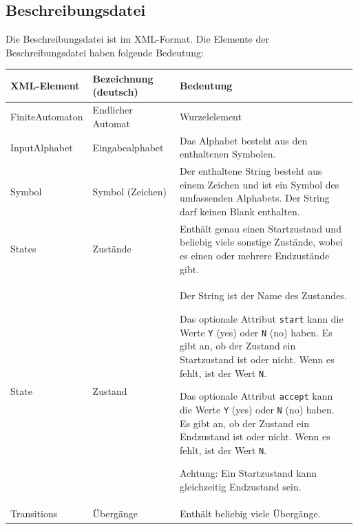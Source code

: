 \subsection{Beschreibungsdatei\label{sec:2:3}}
Die Beschreibungsdatei ist im XML-Format. Die Elemente der Beschreibungsdatei
haben folgende Bedeutung:

{\footnotesize
\begin{table}[H]\centering
\begin{tabular}{|l|l|l|}\hline
XML-Element     & Bezeichnung (deutsch) & Bedeutung      \\ \hline \hline
FiniteAutomaton & Endlicher Automat     & Wurzelelement  \\ \hline
InputAlphabet   & Eingabealphabet       & 
	\begin{minipage}{0.5\textwidth}
		Das Alphabet besteht aus den enthaltenen Symbolen.\vspace{0.5ex}
	\end{minipage}\\ \hline
Symbol         & Symbol (Zeichen)      &
	\begin{minipage}{0.5\textwidth}
		Der enthaltene String besteht aus einem Zeichen und ist ein Symbol des
		umfassenden Alphabets. Der String darf keinen Blank enthalten.
		\vspace{0.5ex}
	\end{minipage}\\ \hline
States         & Zustände              &
	\begin{minipage}{0.5\textwidth}
		Enthält genau einen Startzustand und beliebig viele sonstige Zustände,
		wobei es einen oder mehrere Endzustände gibt.
		\vspace{0.5ex}
	\end{minipage}\\ \hline
State          & Zustand               &
	\begin{minipage}{0.5\textwidth}
		Der String ist der Name des Zustandes.

		Das optionale Attribut \texttt{start} kann die Werte \texttt{Y} (yes) oder 
		\texttt{N} (no)
		haben. Es gibt an, ob der Zustand ein Startzustand ist oder nicht. Wenn
		es fehlt, ist der Wert \texttt{N}.

		Das optionale Attribut \texttt{accept} kann die Werte \texttt{Y} (yes) 
		oder \texttt{N} (no)
		haben. Es gibt an, ob der Zustand ein Endzustand ist oder nicht. Wenn
		es fehlt, ist der Wert \texttt{N}.

		Achtung: Ein Startzustand kann gleichzeitig Endzustand sein.
		\vspace{0.5ex}
	\end{minipage}\\ \hline
Transitions    & Übergänge            &
	\begin{minipage}{0.5\textwidth}
		Enthält beliebig viele Übergänge.


\end{minipage}
\end{tabular}
\end{table}}
